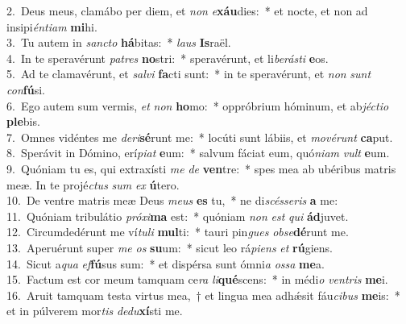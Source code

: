 {2.~}Deus meus, clamábo per diem, et \textit{non} \textit{e}\textbf{xáu}dies:~* et nocte, et non ad insipi\textit{én}\textit{ti}\textit{am} \textbf{mi}hi.\\
{3.~}Tu autem in \textit{san}\textit{cto} \textbf{há}bitas:~* \textit{laus} \textbf{Is}raël.\\
{4.~}In te speravérunt \textit{pa}\textit{tres} \textbf{no}stri:~* speravérunt, et li\textit{be}\textit{rá}\textit{sti} \textbf{e}os.\\
{5.~}Ad te clamavérunt, et \textit{sal}\textit{vi} \textbf{fa}cti sunt:~* in te speravérunt, et \textit{non} \textit{sunt} \textit{con}\textbf{fú}si.\\
{6.~}Ego autem sum vermis, \textit{et} \textit{non} \textbf{ho}mo:~* oppróbrium hóminum, et ab\textit{jé}\textit{cti}\textit{o} \textbf{ple}bis.\\
{7.~}Omnes vidéntes me \textit{de}\textit{ri}\textbf{sé}runt me:~* locúti sunt lábiis, et \textit{mo}\textit{vé}\textit{runt} \textbf{ca}put.\\
{8.~}Sperávit in Dómino, erí\textit{pi}\textit{at} \textbf{e}um:~* salvum fáciat eum, quó\textit{ni}\textit{am} \textit{vult} \textbf{e}um.\\
{9.~}Quóniam tu es, qui extraxísti \textit{me} \textit{de} \textbf{ven}tre:~* spes mea ab ubéribus matris meæ. In te projé\textit{ctus} \textit{sum} \textit{ex} \textbf{ú}tero.\\
{10.~}De ventre matris meæ Deus \textit{me}\textit{us} \textbf{es} tu,~* ne di\textit{scés}\textit{se}\textit{ris} \textbf{a} me:\\
{11.~}Quóniam tribulátio \textit{pró}\textit{xi}\textbf{ma} est:~* quóniam \textit{non} \textit{est} \textit{qui} \textbf{ád}juvet.\\
{12.~}Circumdedérunt me ví\textit{tu}\textit{li} \textbf{mul}ti:~* tauri pin\textit{gues} \textit{ob}\textit{se}\textbf{dé}runt me.\\
{13.~}Aperuérunt super \textit{me} \textit{os} \textbf{su}um:~* sicut leo rá\textit{pi}\textit{ens} \textit{et} \textbf{rú}giens.\\
{14.~}Sicut a\textit{qua} \textit{ef}\textbf{fú}sus sum:~* et dispérsa sunt ómni\textit{a} \textit{os}\textit{sa} \textbf{me}a.\\
{15.~}Factum est cor meum tamquam ce\textit{ra} \textit{li}\textbf{qué}scens:~* in médi\textit{o} \textit{ven}\textit{tris} \textbf{me}i.\\
{16.~}Aruit tamquam testa virtus mea,~† et lingua mea adhǽsit fáu\textit{ci}\textit{bus} \textbf{me}is:~* et in púlverem mor\textit{tis} \textit{de}\textit{du}\textbf{xí}sti me.\\
